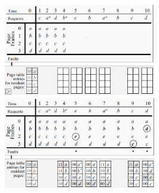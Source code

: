 \documentclass[12pt]{article}
\begin{document}
		
		\centering\includegraphics[width=10cm,height=4cm]{SecondChance_1.PNG}
		\centering\includegraphics[width=10cm,height=4cm]{SecondChance_2.PNG}
		
\end{document}

